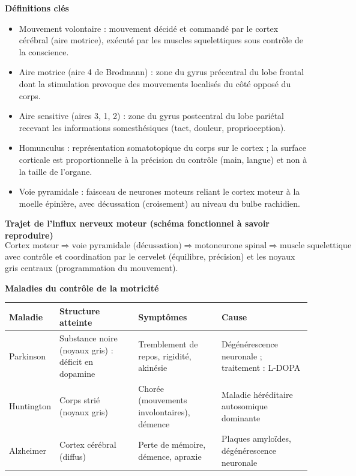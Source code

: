 \documentclass[11pt]{article}
\newcommand{\cle}[1]{{\popxbold\color{popdark}#1}}
\begin{document}
\begin{bilan}
\textbf{D\'efinitions cl\'es}
\begin{itemize}
  \item \cle{Mouvement volontaire} : mouvement d\'ecid\'e et command\'e par le \cle{cortex c\'er\'ebral} (aire motrice), ex\'ecut\'e par les muscles squelettiques sous contr\^ole de la conscience.
  \item \cle{Aire motrice} (aire 4 de Brodmann) : zone du \cle{gyrus pr\'ecentral} du lobe frontal dont la stimulation provoque des mouvements localis\'es du c\^ot\'e oppos\'e du corps.
  \item \cle{Aire sensitive} (aires 3, 1, 2) : zone du \cle{gyrus postcentral} du lobe pari\'etal recevant les informations somesth\'esiques (tact, douleur, proprioception).
  \item \cle{Homunculus} : repr\'esentation somatotopique du corps sur le cortex ; la surface corticale est proportionnelle \`a la pr\'ecision du contr\^ole (main, langue) et non \`a la taille de l'organe.
  \item \cle{Voie pyramidale} : faisceau de neurones moteurs reliant le cortex moteur \`a la moelle \'epini\`ere, avec \cle{d\'ecussation} (croisement) au niveau du bulbe rachidien.
\end{itemize}

\textbf{Trajet de l'influx nerveux moteur (sch\'ema fonctionnel \`a savoir reproduire)}
\[ \text{Cortex moteur} \Rightarrow \text{voie pyramidale (d\'ecussation)} \Rightarrow \text{motoneurone spinal} \Rightarrow \text{muscle squelettique} \]
avec contr\^ole et coordination par le \cle{cervelet} (\'equilibre, pr\'ecision) et les \cle{noyaux gris centraux} (programmation du mouvement).

\textbf{Maladies du contr\^ole de la motricit\'e}
\begin{center}
\begin{tabularx}{\linewidth}{|l|X|X|X|}
\hline
\rowcolor{popblueL} \textbf{Maladie} & \textbf{Structure atteinte} & \textbf{Sympt\^omes} & \textbf{Cause} \\
\hline
Parkinson & Substance noire (noyaux gris) : d\'eficit en \cle{dopamine} & Tremblement de repos, rigidit\'e, akin\'esie & D\'eg\'en\'erescence neuronale ; traitement : L-DOPA \\
\hline
Huntington & Corps stri\'e (noyaux gris) & Chor\'ee (mouvements involontaires), d\'emence & Maladie h\'er\'editaire autosomique dominante \\
\hline
Alzheimer & Cortex c\'er\'ebral (diffus) & Perte de m\'emoire, d\'emence, apraxie & Plaques amylo\"ides, d\'eg\'en\'erescence neuronale \\
\hline
\end{tabularx}
\end{center}


\end{bilan}
\end{document}
